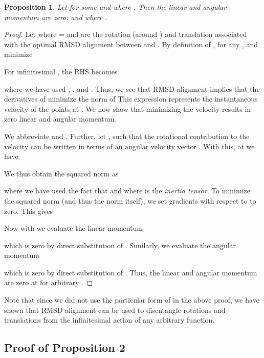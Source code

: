 \documentclass{article} \usepackage{iclr2023_conference,times}
\newcommand{\rebut}[1]{#1}
\newenvironment{rebuttal}{}{}
\begin{document}
\newtheorem{prop}{Proposition}
\begin{prop}
Let  for some  and where . Then the linear and angular momentum are zero:  and  where .
\end{prop}
\begin{proof}
    Let  where  =  and  are the rotation (around ) and translation associated with the optimal RMSD alignment between  and . By definition of , \rebut{for any ,  and  minimize}
    \begin{rebuttal}
    
    For infinitesimal , the RHS becomes
    
    where we have used , , and . Thus, we see that RMSD alignment implies that the derivatives of  minimize the norm of
    \end{rebuttal}
    This expression represents the instantaneous velocity of the points  at . \rebut{We now show that minimizing the velocity results in zero linear and angular momentum.}
    
    We abbreviate  and . Further, let , \rebut{such that the rotational contribution to the velocity can be written in terms of an angular velocity vector . With this, at  we have} 
    \begin{rebuttal}
    
    We thus obtain the squared norm as
    \end{rebuttal}
    
    where we have used the fact that  and where  is the  \emph{inertia tensor}. \rebut{To minimize the squared norm (and thus the norm itself), we set gradients with respect to  to zero. This gives}
    
    Now with  we evaluate the linear momentum
    
    which is zero by direct substitution of . Similarly, we evaluate the angular momentum
    
    which is zero by direct substitution of . Thus, the linear and angular momentum are zero at  for arbitrary . 
\end{proof}

Note that since we did not use the particular form of  in the above proof, we have shown that RMSD alignment can be used to disentangle rotations and translations from the infinitesimal action of any arbitrary function.

\subsection{Proof of Proposition 2}
\end{document}
